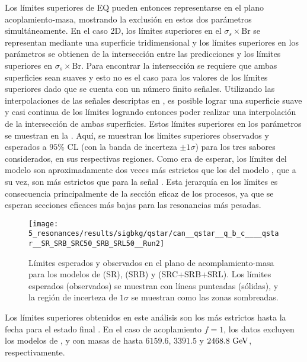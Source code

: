Los límites superiores de \ac{EQ} pueden entonces representarse en el plano acoplamiento-masa, mostrando la exclusión en estos dos parámetros simultáneamente.
En el caso 2D, los límites superiores en el \(\sigma_s \times \text{Br}\) se representan mediante una superficie tridimensional y los límites superiores en los parámetros se obtienen de la intersección entre las predicciones y los límites superiores en \(\sigma_s \times \text{Br}\). Para encontrar la intersección se requiere que ambas superficies sean suaves y esto no es el caso para los valores de los límites superiores dado que se cuenta con un número finito señales. Utilizando las interpolaciones de las señales descriptas en \Sect{\ref{sec:signals:modeling}}, es posible lograr una superficie suave y casi continua de los límites logrando entonces poder realizar una interpolación de la intersección de ambas superficies. Estos límites superiores en los parámetros se muestran en la \Fig{\ref{fig:results:results:bkgsig:results:qstar:limits_2d}}. Aquí, se muestran los límites superiores observados y esperados a \(95\%\) \ac{CL} (con la banda de incerteza \(\pm 1 \sigma\)) para los tres sabores considerados, en sus respectivas regiones. Como era de esperar, los límites del modelo \qstar son aproximadamente dos veces más estrictos que los del modelo \cstar, que a su vez, son más estrictos que para la señal \bstar. Esta jerarquía en los límites es consecuencia principalmente de la sección eficaz de los procesos, ya que se esperan secciones eficaces más bajas para las resonancias más pesadas.

\begin{figure}[ht!]
    \centering
    \texttt{[image: 5\_resonances/results/sigbkg/qstar/can\_\_qstar\_\_q\_b\_c\_\_\_\_qstar\_\_SR\_SRB\_SRC50\_SRB\_SRL50\_\_Run2]}
    \caption{Límites esperados y observados en el plano de acomplamiento-masa para los modelos de \qstar (SR), \bstar (SRB) y \cstar (SRC+SRB+SRL). Los límites esperados (observados) se muestran con líneas punteadas (sólidas), y la región de incerteza de \(1\sigma\) se muestran como las zonas sombreadas.}
    \label{fig:results:results:bkgsig:results:qstar:limits_2d}
\end{figure}

Los límites superiores obtenidos en este análisis son los más estrictos hasta la fecha para el estado final \gammajet. En el caso de acoplamiento \(f=1\), los datos excluyen los modelos de \qstar, \cstar y \bstar con masas de hasta \(6159.6\), \(3391.5\) y \(2468.8~\text{GeV}\), respectivamente.



